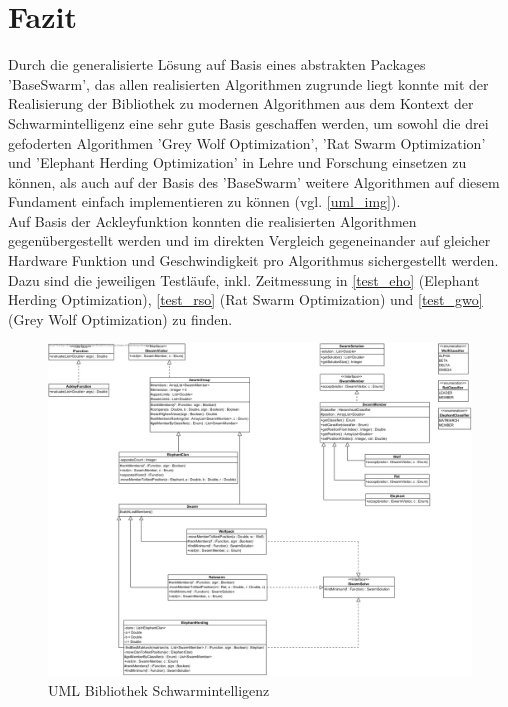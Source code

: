 \chapter{Fazit}
Durch die generalisierte Lösung auf Basis eines abstrakten Packages 'BaseSwarm', das allen realisierten Algorithmen zugrunde liegt konnte mit der Realisierung der Bibliothek zu modernen Algorithmen aus dem Kontext der Schwarmintelligenz eine sehr gute Basis geschaffen werden, um sowohl die drei gefoderten Algorithmen 'Grey Wolf Optimization', 'Rat Swarm Optimization' und 'Elephant Herding Optimization' in Lehre und Forschung einsetzen zu können, als auch auf der Basis des 'BaseSwarm' weitere Algorithmen auf diesem Fundament einfach implementieren zu können (vgl. \autoref{uml_img}). \\
Auf Basis der Ackleyfunktion konnten die realisierten Algorithmen gegenübergestellt werden und im direkten Vergleich gegeneinander auf gleicher Hardware Funktion und Geschwindigkeit pro Algorithmus sichergestellt werden. Dazu sind die jeweiligen Testläufe, inkl. Zeitmessung in \autoref{test_eho} (Elephant Herding Optimization), \autoref{test_rso} (Rat Swarm Optimization) und \autoref{test_gwo} (Grey Wolf Optimization) zu finden.

\begin{figure}[ht]
    \begin{center}
        \includegraphics[width=1.0\textwidth]{../SwarmOptimization.jpg}
        \caption{UML Bibliothek Schwarmintelligenz}
        \label{uml_img}
    \end{center}
\end{figure} 

